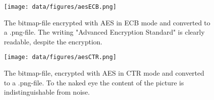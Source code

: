 \begin{figure}[h]
\centering
\texttt{[image: data/figures/aesECB.png]}
\caption{The bitmap-file encrypted with AES in ECB mode and converted to a .png-file. The writing "Advanced Encryption Standard" is clearly readable, despite the encryption.}
\label{fig:aesecbpng}
\end{figure}

\begin{figure}[h]
\centering
\texttt{[image: data/figures/aesCTR.png]}
\caption{The bitmap-file, encrypted with AES in CTR mode and converted to a .png-file. To the naked eye the content of the picture is indistinguishable from noise.}
\label{fig:aesctrpng}
\end{figure}


\begin{table}[h]
\end{table}
